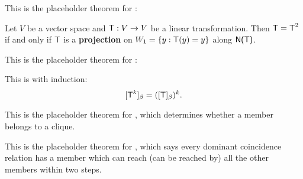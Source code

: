 \begin{additional theorem} \label{athm 2.31}
This is the placeholder theorem for :

Let \(V\) be a vector space and \(\textsf{T} : V \to V\) be a linear transformation.
Then \(\textsf{T} = \textsf{T}^2\) if and only if \(\textsf{T}\) is a \textbf{projection} on \(W_1 = \{ y : \textsf{T}(y) = y \}\)
along \(\textsf{N(T)}\).
\end{additional theorem}

\begin{additional theorem} \label{athm 2.32}
This is the placeholder theorem for :

This is  with induction:
\[
    [\textsf{T}^k]_{\beta} = ([\textsf{T}]_{\beta})^k.
\]
\end{additional theorem}

\begin{additional theorem} \label{athm 2.33}
This is the placeholder theorem for , which determines whether a member belongs to a clique.
\end{additional theorem}

\begin{additional theorem} \label{athm 2.34}
This is the placeholder theorem for , which says every dominant coincidence relation has a member which can reach (can be reached by) all the other members within two steps.
\end{additional theorem}
